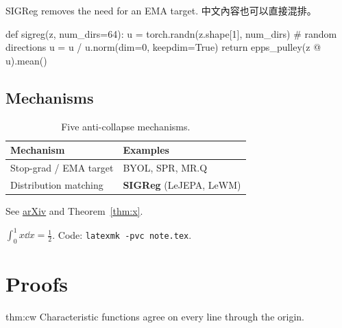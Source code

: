 \documentclass{akizumi-note}
\begin{document}
\begin{remark}
SIGReg removes the need for an EMA target. 中文內容也可以直接混排。
\end{remark}

\begin{codeblock}[lang=Python, title=sigreg.py]
def sigreg(z, num_dirs=64):
    u = torch.randn(z.shape[1], num_dirs)   # random directions
    u = u / u.norm(dim=0, keepdim=True)
    return epps_pulley(z @ u).mean()
\end{codeblock}

\subsection{Mechanisms}
\begin{table}[h]
\centering\small
\caption{Five anti-collapse mechanisms.}
\begin{tabularx}{\linewidth}{@{}l Y@{}}
\toprule
Mechanism & Examples \\
\midrule
Stop-grad / EMA target & BYOL, SPR, MR.Q \\
Distribution matching & \textbf{SIGReg} (LeJEPA, LeWM) \\
\bottomrule
\end{tabularx}
\end{table}
See \href{https://arxiv.org}{arXiv} and Theorem~\ref{thm:x}.
\begin{lemma}\label{thm:x}
$\int_0^1 x \dd x = \tfrac12$. Code: \texttt{latexmk -pvc note.tex}.
\end{lemma}
\appendix
\section{Proofs}\label{app:proofs}
\cramerwold*
\begin{proofof}{thm:cw}
Characteristic functions agree on every line through the origin.
\end{proofof}

\listoftheorems
\end{document}
